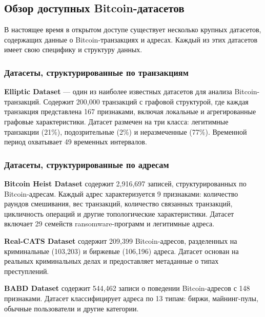 \subsection{Обзор доступных Bitcoin-датасетов}

В настоящее время в открытом доступе существует несколько крупных датасетов, содержащих данные о Bitcoin-транзакциях и адресах. Каждый из этих датасетов имеет свою специфику и структуру данных.

\subsubsection{Датасеты, структурированные по транзакциям}

\textbf{Elliptic Dataset} — один из наиболее известных датасетов для анализа Bitcoin-транзакций. Содержит 200,000 транзакций с графовой структурой, где каждая транзакция представлена 167 признаками, включая локальные и агрегированные графовые характеристики. Датасет размечен на три класса: легитимные транзакции (21\%), подозрительные (2\%) и неразмеченные (77\%). Временной период охватывает 49 временных интервалов.

\subsubsection{Датасеты, структурированные по адресам}

\textbf{Bitcoin Heist Dataset} содержит 2,916,697 записей, структурированных по Bitcoin-адресам. Каждый адрес характеризуется 9 признаками: количество раундов смешивания, вес транзакций, количество связанных транзакций, цикличность операций и другие топологические характеристики. Датасет включает 29 семейств ransomware-программ и легитимные адреса.

\textbf{Real-CATS Dataset} содержит 209,399 Bitcoin-адресов, разделенных на криминальные (103,203) и биржевые (106,196) адреса. Датасет основан на реальных криминальных делах и предоставляет метаданные о типах преступлений.

\textbf{BABD Dataset} содержит 544,462 записи о поведении Bitcoin-адресов с 148 признаками. Датасет классифицирует адреса по 13 типам: биржи, майнинг-пулы, обычные пользователи и другие категории.
